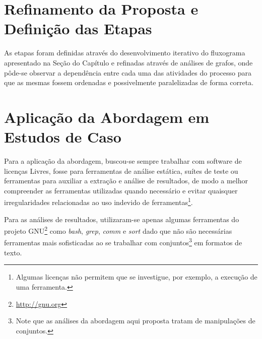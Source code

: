 \section{Refinamento da Proposta e Definição das Etapas}

As etapas foram definidas através do desenvolvimento iterativo do fluxograma apresentado na Seção  do Capítulo  e refinadas através de análises de grafos, onde pôde-se observar a dependência entre cada uma das atividades do processo para que as mesmas fossem ordenadas e possivelmente paralelizadas de forma correta.

\section{Aplicação da Abordagem em Estudos de Caso}

Para a aplicação da abordagem, buscou-se sempre trabalhar com software de licenças Livres, fosse para ferramentas de análise estática, suítes de teste ou ferramentas para auxiliar a extração e análise de resultados, de modo a melhor compreender as ferramentas utilizadas quando necessário e evitar quaisquer irregularidades relacionadas ao uso indevido de ferramentas\footnote{Algumas licenças não permitem que se investigue, por exemplo, a execução de uma ferramenta.}.

Para as análises de resultados, utilizaram-se apenas algumas ferramentas do projeto GNU\footnote{\url{http://gnu.org}} como \textit{bash}, \textit{grep}, \textit{comm} e \textit{sort} dado que não são necessárias ferramentas mais sofisticadas ao se trabalhar com conjuntos\footnote{Note que as análises da abordagem aqui proposta tratam de manipulações de conjuntos.} em formatos de texto.

